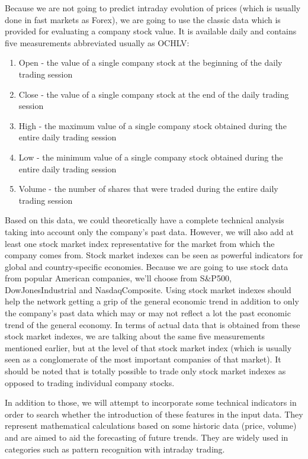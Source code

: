 Because we are not going to predict intraday evolution of prices (which is usually done in fast markets as Forex), we are going to use the classic data which is provided for evaluating a company stock value. It is available daily and contains five measurements abbreviated usually as OCHLV:
\begin{enumerate}
    \item Open - the value of a single company stock at the beginning of the daily trading session
    \item Close - the value of a single company stock at the end of the daily trading session
    \item High - the maximum value of a single company stock obtained during the entire daily trading session
    \item Low - the minimum value of a single company stock obtained during the entire daily trading session
    \item Volume - the number of shares that were traded during the entire daily trading session
\end{enumerate}
Based on this data, we could theoretically have a complete technical analysis taking into account only the company's past data. However, we will also add at least one stock market index representative for the market from which the company comes from. Stock market indexes can be seen as powerful indicators for global and country-specific economies. Because we are going to use stock data from popular American companies, we'll choose from S\&P500, DowJonesIndustrial and NasdaqComposite. Using stock market indexes should help the network getting a grip of the general economic trend in addition to only the company's past data which may or may not reflect a lot the past economic trend of the general economy. In terms of actual data that is obtained from these stock market indexes, we are talking about the same five measurements mentioned earlier, but at the level of that stock market index (which is usually seen as a conglomerate of the most important companies of that market). It should be noted that is totally possible to trade only stock market indexes as opposed to trading individual company stocks.

In addition to those, we will attempt to incorporate some technical indicators in order to search whether the introduction of these features in the input data. They represent mathematical calculations based on some historic data (price, volume) and are aimed to aid the forecasting of future trends. They are widely used in categories such as pattern recognition with intraday trading.


